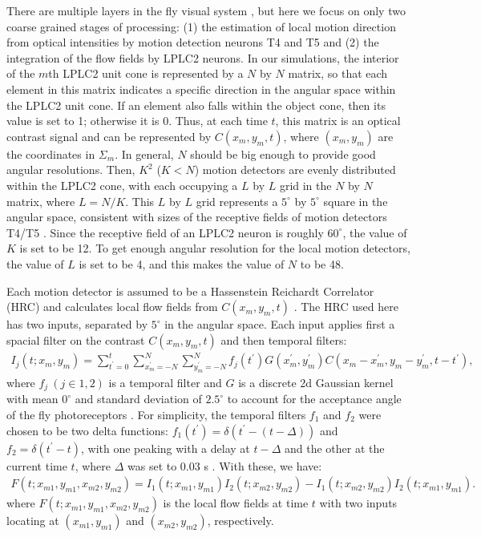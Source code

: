 \documentclass[pdftex,9pt,lineno]{elife}
\begin{document}
There are multiple layers in the fly visual system \citep{takemura2017comprehensive}, but here we focus on only two coarse grained stages of processing: (1) the estimation of local motion direction from optical intensities by motion detection neurons T4 and T5 and (2) the integration of the flow fields by LPLC2 neurons. In our simulations, the interior of the $m$th LPLC2 unit cone is represented by a $N$ by $N$ matrix, so that each element in this matrix indicates a specific direction in the angular space within the LPLC2 unit cone. If an element also falls within the object cone, then its value is set to 1; otherwise it is 0. Thus, at each time $t$, this matrix is an optical contrast signal and can be represented by $C(x_{m},y_{m},t)$, where $(x_{m},y_{m})$ are the coordinates in $\Sigma_{m}$. In general, $N$ should be big enough to provide good angular resolutions. Then, $K^{2}$ ($K<N$) motion detectors are evenly distributed within the LPLC2 cone, with each occupying a $L$ by $L$ grid in the $N$ by $N$ matrix, where $L=N/K$. This $L$ by $L$ grid represents a $5^{\circ}$ by $5^{\circ}$ square in the angular space, consistent with sizes of the receptive fields of motion detectors T4/T5 \citep{zavatone2020minimal}. Since the receptive field of an LPLC2 neuron is roughly $60^{\circ}$, the value of $K$ is set to be 12. To get enough angular resolution for the local motion detectors, the value of $L$ is set to be 4, and this makes the value of $N$ to be 48.

Each motion detector is assumed to be a Hassenstein Reichardt Correlator (HRC) and calculates local flow fields from $C(x_{m},y_{m},t)$ \citep{hassenstein1956systemtheoretische}. The HRC used here has two inputs, separated by $5^{\circ}$ in the angular space. Each input applies first a spacial filter on the contrast $C(x_{m},y_{m},t)$ and then temporal filters:
\begin{align}
I_{j}(t;x_{m},y_{m}) = \sum_{t^{'}=0}^{t}\sum_{x^{'}_{m}=-N}^{N}\sum_{y^{'}_{m}=-N}^{N}f_{j}(t^{'})G(x^{'}_{m},y^{'}_{m})C(x_{m}-x^{'}_{m},y_{m}-y^{'}_{m},t-t^{'}),
\end{align}
where $f_{j}\ (j \in {1,2})$ is a temporal filter and $G$ is a discrete 2d Gaussian kernel with mean $0^{\circ}$ and standard deviation of $2.5^{\circ}$ to account for the acceptance angle of the fly photoreceptors \citep{stavenga2003angular}. For simplicity, the temporal filters $f_{1}$ and $f_{2}$ were chosen to be two delta functions: $f_{1}(t^{'})=\delta (t^{'}-(t-\Delta))$ and $f_{2}=\delta (t^{'}-t)$, with one peaking with a delay at $t-\Delta$ and the other at the current time $t$, where $\Delta$ was set to 0.03 s \citep{salazar2016direct}. With these, we have:
\begin{align}\label{eq:HRC}
F(t;x_{m1},y_{m1},x_{m2},y_{m2}) = I_{1}(t;x_{m1},y_{m1})I_{2}(t;x_{m2},y_{m2})-I_{1}(t;x_{m2},y_{m2})I_{2}(t;x_{m1},y_{m1}).
\end{align}
where $F(t;x_{m1},y_{m1},x_{m2},y_{m2})$ is the local flow fields at time $t$ with two inputs locating at $(x_{m1},y_{m1})$ and $(x_{m2},y_{m2})$, respectively.
\end{document}
